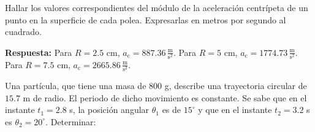 \documentclass[addpoints]{exam}
\newcommand{\grado}[0]{^{\circ}}
\newcommand{\rta}{\textbf{Respuesta: }}
\begin{document}
\begin{questions}
    \question Hallar los valores correspondientes del módulo de la aceleración centrípeta de un punto en la superficie de cada polea. Expresarlas en metros por segundo al cuadrado.

    \rta Para $R = 2.5$ cm, $a_\text{c} = 887.36 \, \frac{\text{m}}{\text{s}^2}$. Para $R = 5$ cm, $a_\text{c} = 1774.73 \, \frac{\text{m}}{\text{s}^2}$. Para $R = 7.5$ cm, $a_\text{c} = 2665.86 \, \frac{\text{m}}{\text{s}^2}$.

    \question Una partícula, que tiene una masa de 800 g, describe una trayectoria circular de $15.7$ m de radio. El periodo de dicho movimiento es constante. Se sabe que en el instante $t_1 = 2.8$ s, la posición angular $\theta_1$ es de $15\grado$ y que en el instante $t_2 = 3.2$ s es $\theta_2 = 20\grado$. Determinar:

    \begin{solution}
\end{solution}
\end{questions}
\end{document}
